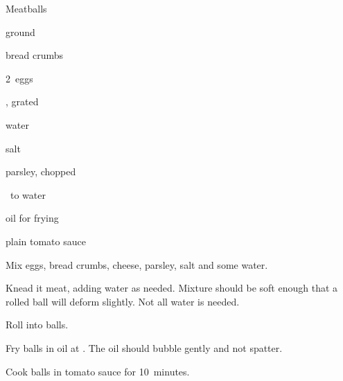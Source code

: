 \begin{recipe}{Meatballs}{}{}

\begin{ingredients}
\item {} ground 
\item {} bread crumbs
\item 2~eggs
\item {} , grated
\item {} water
\item {} salt
\item parsley, chopped 
\item \quarter\ to \C{\half} water
\item oil for frying
\item plain tomato sauce
\end{ingredients}

\begin{directions}
\item Mix eggs, bread crumbs, cheese, parsley, salt and some water.
\item Knead it meat, adding water as needed. Mixture should be soft enough that a rolled ball will deform slightly. Not all water is needed.
\item Roll into balls.
\item Fry balls in oil at . The oil should bubble gently and not spatter.
\item Cook balls in tomato sauce for 10~minutes.
\end{directions}

\end{recipe}
